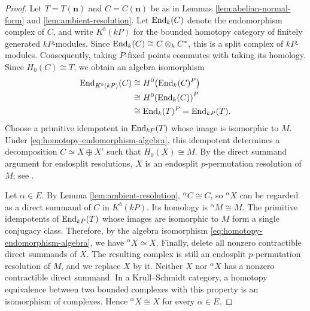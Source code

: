 \documentclass[preprint,12pt,3p]{elsarticle}
\def\End{{\rm End}}
\begin{document}
\begin{proof}
Let $T=T(\mathbf n)$ and $C=C(\mathbf n)$ be as in Lemmas \ref{lem:abelian-normal-form} and \ref{lem:ambient-resolution}. Let $\End_k(C)$ denote the endomorphism complex of $C$, and write $K^b(kP)$ for the bounded homotopy category of finitely generated $kP$-modules. Since $\End_k(C)\cong C\otimes_k C^*$, this is a split complex of $kP$-modules. Consequently, taking $P$-fixed points commutes with taking its homology. Since $H_0(C)\cong T$, we obtain an algebra isomorphism
\begin{equation}\label{eq:homotopy-endomorphism-algebra}
 \begin{aligned}
 \End_{K^b(kP)}(C)&\cong H^0\!\left(\End_k(C)^P\right)\\
 &\cong H^0\!\left(\End_k(C)\right)^P\\
 &\cong\End_k(T)^P=\End_{kP}(T).
 \end{aligned}
\end{equation}
Choose a primitive idempotent in $\End_{kP}(T)$ whose image is isomorphic to $M$. Under \eqref{eq:homotopy-endomorphism-algebra}, this idempotent determines a decomposition $C\simeq X\oplus X'$ such that $H_0(X)\cong M$. By the direct summand argument for endosplit resolutions, $X$ is an endosplit $p$-permutation resolution of $M$; see \cite[Propositions 7.11.2 and 7.11.6 (iii)]{Lin18b}.

Let $\alpha\in E$. By Lemma \ref{lem:ambient-resolution}, ${}^\alpha C\cong C$, so ${}^\alpha X$ can be regarded as a direct summand of $C$ in $K^b(kP)$. Its homology is ${}^\alpha M\cong M$. The primitive idempotents of $\End_{kP}(T)$ whose images are isomorphic to $M$ form a single conjugacy class. Therefore, by the algebra isomorphism \eqref{eq:homotopy-endomorphism-algebra}, we have ${}^\alpha X\simeq X$. Finally, delete all nonzero contractible direct summands of $X$. The resulting complex is still an endosplit $p$-permutation resolution of $M$, and we replace $X$ by it. Neither $X$ nor ${}^\alpha X$ has a nonzero contractible direct summand. In a Krull--Schmidt category, a homotopy equivalence between two bounded complexes with this property is an isomorphism of complexes. Hence ${}^\alpha X\cong X$ for every $\alpha\in E$.
\end{proof}
\end{document}
